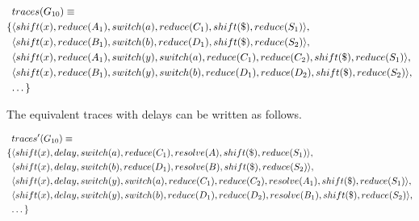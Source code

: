 \documentclass[a4paper,11pt]{article}
\begin{document}
{\small\parbox{.3\textwidth}{\begin{align*}
&traces(G_{10}) \equiv \\
\{ & \langle shift(x), reduce(A_1), switch(a), reduce(C_1), shift(\$), reduce(S_1) \rangle,\\
   & \langle shift(x), reduce(B_1), switch(b), reduce(D_1), shift(\$), reduce(S_2) \rangle,\\
   & \langle shift(x), reduce(A_1), switch(y), switch(a), reduce(C_1), reduce(C_2), shift(\$), reduce(S_1) \rangle,\\
   & \langle shift(x), reduce(B_1), switch(y), switch(b), reduce(D_1), reduce(D_2), shift(\$), reduce(S_2) \rangle,\\
   & \textellipsis \}
\end{align*}}}

The equivalent traces with delays can be written as follows.

{\small\parbox{.3\textwidth}{\begin{align*}
&traces^{\prime}(G_{10}) \equiv \\
 \{ & \langle shift(x), delay, switch(a), reduce(C_1), resolve(A), shift(\$), reduce(S_1) \rangle,\\
    & \langle shift(x), delay, switch(b), reduce(D_1), resolve(B), shift(\$), reduce(S_2) \rangle,\\
    & \langle shift(x), delay, switch(y), switch(a), reduce(C_1), reduce(C_2), resolve(A_1), shift(\$), reduce(S_1) \rangle,\\
    & \langle shift(x), delay, switch(y), switch(b), reduce(D_1), reduce(D_2), resolve(B_1), shift(\$), reduce(S_2) \rangle,\\
    & \textellipsis \}
\end{align*}}}

\end{document}
